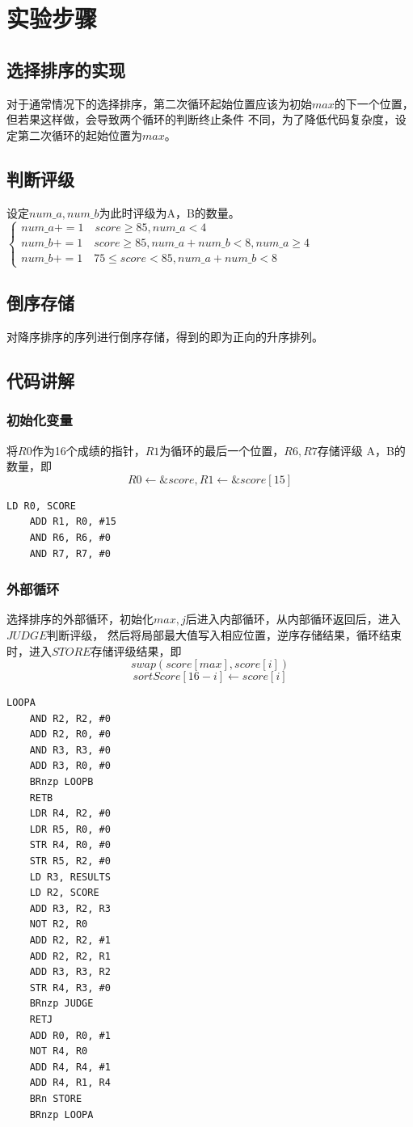 \documentclass[12pt, a4paper, oneside]{ctexart}
\begin{document}
\section*{实验步骤}
\subsection*{选择排序的实现}
对于通常情况下的选择排序，第二次循环起始位置应该为初始$max$的下一个位置，但若果这样做，会导致两个循环的判断终止条件
不同，为了降低代码复杂度，设定第二次循环的起始位置为$max$。
\subsection*{判断评级}
设定$num\_a,num\_b$为此时评级为A，B的数量。\\
$\begin{cases}
    num\_a += 1 \quad score \geq 85,num\_a < 4\\
    num\_b += 1 \quad score \geq 85,num\_a + num\_b < 8 , num\_a \geq 4 \\
    num\_b += 1 \quad 75 \leq score < 85,num\_a + num\_b < 8
\end{cases}$
\subsection*{倒序存储}
对降序排序的序列进行倒序存储，得到的即为正向的升序排列。
\subsection*{代码讲解}
\subsubsection*{初始化变量}
将$R0$作为16个成绩的指针，$R1$为循环的最后一个位置，$R6,R7$存储评级
A，B的数量，即
$$R0 \leftarrow \& score, R1 \leftarrow \& score[15]$$
\begin{lstlisting}[name = code, firstnumber = 1]
    LD R0, SCORE
    ADD R1, R0, #15
    AND R6, R6, #0
    AND R7, R7, #0
\end{lstlisting}
\subsubsection*{外部循环}
选择排序的外部循环，初始化$max,j$后进入内部循环，从内部循环返回后，进入$JUDGE$判断评级，
然后将局部最大值写入相应位置，逆序存储结果，循环结束时，进入$STORE$存储评级结果，即
$$swap(score[max], score[i])$$
$$sortScore[16-i] \leftarrow score[i]$$
\begin{lstlisting}[name = code, firstnumber = last]
    LOOPA 
    AND R2, R2, #0
    ADD R2, R0, #0
    AND R3, R3, #0
    ADD R3, R0, #0
    BRnzp LOOPB
    RETB
    LDR R4, R2, #0
    LDR R5, R0, #0
    STR R4, R0, #0
    STR R5, R2, #0
    LD R3, RESULTS
    LD R2, SCORE
    ADD R3, R2, R3
    NOT R2, R0
    ADD R2, R2, #1
    ADD R2, R2, R1
    ADD R3, R3, R2
    STR R4, R3, #0
    BRnzp JUDGE
    RETJ
    ADD R0, R0, #1
    NOT R4, R0
    ADD R4, R4, #1
    ADD R4, R1, R4
    BRn STORE
    BRnzp LOOPA
\end{lstlisting}
\end{document}
